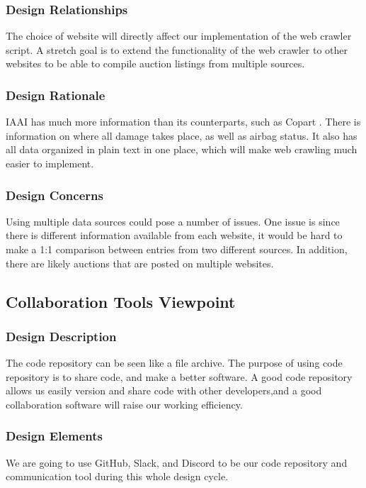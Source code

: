 \documentclass[onecolumn, draftclsnofoot, 10pt, compsoc]{IEEEtran}
\begin{document}
\subsubsection{Design Relationships}
The choice of website will directly affect our implementation of the web crawler script. A stretch goal is to extend the functionality of the web crawler to other websites to be able to compile auction listings from multiple sources. 

\subsubsection{Design Rationale}
IAAI has much more information than its counterparts, such as Copart \cite{copart}. There is information on where all damage takes place, as well as airbag status. It also has all data organized in plain text in one place, which will make web crawling much easier to implement. 

\subsubsection{Design Concerns}
Using multiple data sources could pose a number of issues. One issue is since there is different information available from each website, it would be hard to make a 1:1 comparison between entries from two different sources. In addition, there are likely auctions that are posted on multiple websites. 





\subsection{Collaboration Tools Viewpoint}
\subsubsection{Design Description}
The code repository can be seen like a file archive. The purpose of using code repository is to share code, and make a better software. A good code repository allows us easily version and share code with other developers,and a good collaboration software will raise our working efficiency.
\subsubsection{Design Elements}
We are going to use GitHub, Slack, and Discord to be our code repository and communication tool during this whole design cycle. 
\end{document}
